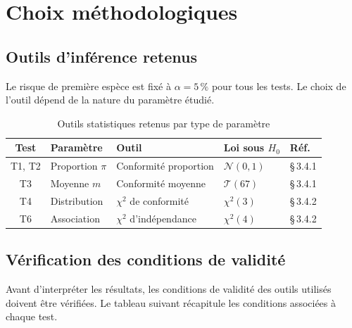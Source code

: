 
\section{Choix méthodologiques}

\subsection{Outils d'inférence retenus}

Le risque de première espèce est fixé à $\alpha = 5\,\%$ pour tous les tests.
Le choix de l'outil dépend de la nature du paramètre étudié.

\begin{table}[H]
\centering\small
\begin{tabular}{@{}cllll@{}}
\toprule
Test & Paramètre & Outil & Loi sous $H_0$ & Réf. \\
\midrule
T1, T2 & Proportion $\pi$ & Conformité proportion & $\mathcal{N}(0,1)$ & §\,3.4.1 \\
T3     & Moyenne $m$      & Conformité moyenne    & $\mathcal{T}(67)$  & §\,3.4.1 \\
T4     & Distribution     & $\chi^2$ de conformité   & $\chi^2(3)$     & §\,3.4.2 \\
T6     & Association      & $\chi^2$ d'indépendance  & $\chi^2(4)$     & §\,3.4.2 \\
\bottomrule
\end{tabular}
\caption{Outils statistiques retenus par type de paramètre}
\end{table}

\subsection{Vérification des conditions de validité}

Avant d'interpréter les résultats, les conditions de validité des outils utilisés doivent être vérifiées. Le tableau suivant récapitule les conditions associées à chaque test.

